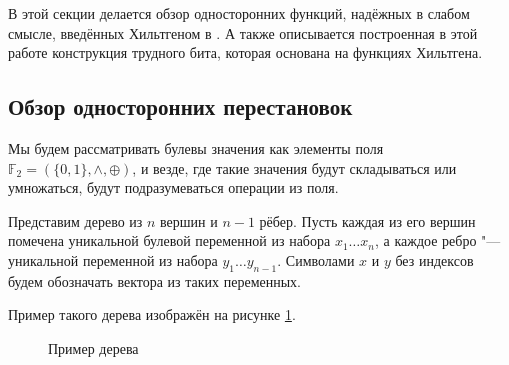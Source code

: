 \documentclass[oneside, a4paper]{article}
\theoremstyle{plain}
\theoremstyle{remark}
\newcommand\F{\ensuremath{{\mathbb F}_2}}
\begin{document}
В этой секции делается обзор односторонних функций, надёжных в слабом смысле,
введённых Хильтгеном в \cite{hiltgen1993}. А также описывается построенная в
этой работе конструкция трудного бита, которая основана на функциях Хильтгена.

\subsection{Обзор односторонних перестановок}

Мы будем рассматривать булевы значения как элементы поля $\F = (\{0, 1\}, \land,
\oplus)$, и везде, где такие значения будут складываться или умножаться, будут
подразумеваться операции из поля.

Представим дерево из $n$ вершин и $n - 1$ рёбер. Пусть каждая из его вершин
помечена уникальной булевой переменной из набора $x_1 \dots x_n$, а каждое ребро
"--- уникальной переменной из набора $y_1 \dots y_{n-1}$. Символами $x$ и $y$ без
индексов будем обозначать вектора из таких переменных.

Пример такого дерева изображён на рисунке \ref{fig_tree}.

\begin{figure}[h]
\centering
{}
\caption{Пример дерева}
\label{fig_tree}
\end{figure}
\end{document}
